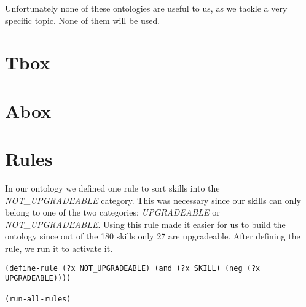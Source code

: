 \documentclass[a4paper,12pt]{report}
\begin{document}
Unfortunately none of these ontologies are useful to us, as we tackle a very specific topic. None of them will be used.


\clearpage
\section{Tbox}


\clearpage
\section{Abox}


\clearpage
\section{Rules}
In our ontology we defined one rule to sort skills into the \textit{NOT\_UPGRADEABLE} category. This was necessary since our skills can only belong to one of the two categories: \textit{UPGRADEABLE} or \textit{NOT\_UPGRADEABLE}. Using this rule made it easier for us to build the ontology since out of the 180 skills only 27 are upgradeable. After defining the rule, we run it to activate it.
\begin{lstlisting}
(define-rule (?x NOT_UPGRADEABLE) (and (?x SKILL) (neg (?x UPGRADEABLE))))

(run-all-rules)  
\end{lstlisting}

\clearpage
\end{document}
